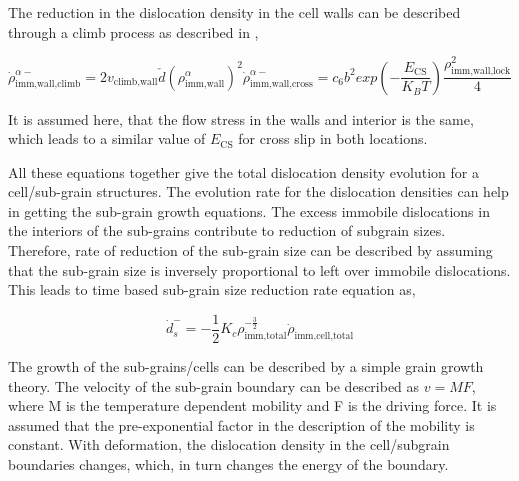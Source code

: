 \documentclass[a4paper,11pt]{article}
\begin{document}
The reduction in the dislocation density in the cell walls can be described through a climb process as described in \cite{Roters2000},

\begin{subequations}
\begin{equation}
\dot\rho_{\text{imm,wall,climb}}^{\alpha-} = 2v_{\text{climb,wall}} \check{d} \left(\rho_{\text{imm,wall}}^{\alpha}\right)^2 \label{eq:20_1}
\end{equation}

\begin{equation}
\dot\rho_{\text{imm,wall,cross}}^{\alpha-} = c_6 b^2 exp\left( - \frac{E_{\text{CS}}}{K_B T} \right) \frac{\rho_{\text{imm,wall,lock}}^2}{4} \label{eq:20_2}
\end{equation}
\end{subequations}

It is assumed here, that the flow stress in the walls and interior is the same, which leads to a similar value of \begin{math} E_{\text{CS}} \end{math} for cross slip in both locations. 


All these equations together give the total dislocation density evolution for a cell/sub-grain structures. 
The evolution rate for the dislocation densities can help in getting the sub-grain growth equations. 
The excess immobile dislocations in the interiors of the sub-grains contribute to reduction of subgrain sizes. 
Therefore, rate of reduction of the sub-grain size can be described by assuming that the sub-grain size is inversely proportional to left over immobile dislocations. 
This leads to time based sub-grain size reduction rate equation as,

\begin{equation}
\dot{d}_s^- = - \frac{1}{2} K_c \rho_{\text{imm,total}}^{-\frac{3}{2}} {\dot{\rho}}_{\text{imm,cell,total}} \label{eq:21}
\end{equation}

The growth of the sub-grains/cells can be described by a simple grain growth theory. 
The velocity of the sub-grain boundary can be described as \begin{math} v = MF \end{math}, where M is the temperature dependent mobility and F is the driving force. 
It is assumed that the pre-exponential factor in the description of the mobility is constant. 
With deformation, the dislocation density in the cell/subgrain boundaries changes, which, in turn changes the energy of the boundary.
\end{document}
